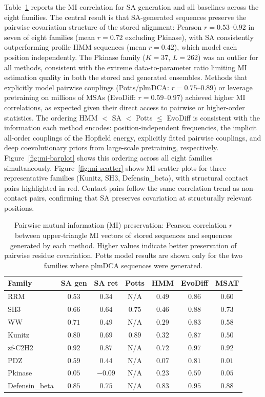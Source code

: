 Table~\ref{tab:mi} reports the MI correlation for SA generation and all baselines across the eight families. The central result is that SA-generated sequences preserve the pairwise covariation structure of the stored alignment: Pearson $r{=}0.53$--$0.92$ in seven of eight families (mean $r{=}0.72$ excluding Pkinase), with SA consistently outperforming profile HMM sequences (mean $r{=}0.42$), which model each position independently. The Pkinase family ($K{=}37$, $L{=}262$) was an outlier for all methods, consistent with the extreme data-to-parameter ratio limiting MI estimation quality in both the stored and generated ensembles. Methods that explicitly model pairwise couplings (Potts/plmDCA: $r{=}0.75$--$0.89$) or leverage pretraining on millions of MSAs (EvoDiff: $r{=}0.59$--$0.97$) achieved higher MI correlations, as expected given their direct access to pairwise or higher-order statistics. The ordering HMM $<$ SA $<$ Potts $\leq$ EvoDiff is consistent with the information each method encodes: position-independent frequencies, the implicit all-order couplings of the Hopfield energy, explicitly fitted pairwise couplings, and deep coevolutionary priors from large-scale pretraining, respectively. Figure~\ref{fig:mi-barplot} shows this ordering across all eight families simultaneously. Figure~\ref{fig:mi-scatter} shows MI scatter plots for three representative families (Kunitz, SH3, Defensin\_beta), with structural contact pairs highlighted in red. Contact pairs follow the same correlation trend as non-contact pairs, confirming that SA preserves covariation at structurally relevant positions.

\begin{table}[ht]
\centering
\caption{Pairwise mutual information (MI) preservation: Pearson correlation $r$ between upper-triangle MI vectors of stored sequences and sequences generated by each method. Higher values indicate better preservation of pairwise residue covariation. Potts model results are shown only for the two families where plmDCA sequences were generated.}
\label{tab:mi}
\small
\begin{tabular}{@{}lcccccc@{}}
\toprule
Family & SA gen & SA ret & Potts & HMM & EvoDiff & MSAT \\
\midrule
RRM            & $0.53$ & $0.34$ & N/A     & $0.49$ & $0.86$ & $0.60$ \\
SH3            & $0.66$ & $0.64$ & $0.75$  & $0.46$ & $0.88$ & $0.73$ \\
WW             & $0.71$ & $0.49$ & N/A     & $0.29$ & $0.83$ & $0.58$ \\
Kunitz         & $0.80$ & $0.69$ & $0.89$  & $0.32$ & $0.87$ & $0.50$ \\
zf-C2H2        & $0.92$ & $0.87$ & N/A     & $0.72$ & $0.97$ & $0.92$ \\
PDZ            & $0.59$ & $0.44$ & N/A     & $0.07$ & $0.81$ & $0.01$ \\
Pkinase        & $0.05$ & $-0.09$ & N/A    & $0.23$ & $0.59$ & $0.05$ \\
Defensin\_beta & $0.85$ & $0.75$ & N/A     & $0.83$ & $0.95$ & $0.88$ \\
\bottomrule
\end{tabular}
\end{table}

